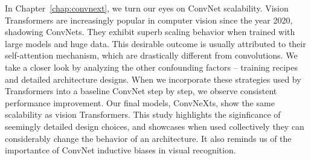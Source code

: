 \documentclass{ucbthesis}
\begin{document}
In Chapter~\ref{chap:convnext}, we turn our eyes on ConvNet scalability. Vision Transformers are increasingly popular in computer vision since the year 2020, shadowing ConvNets. They exhibit superb scaling behavior when trained with large models and huge data. This desirable outcome is usually attributed to their self-attention mechanism, which are drastically different from convolutions. We take a closer look by analyzing the other confounding factors -- training recipes and detailed architecture designs. When we incorporate these strategies used by Transformers into a baseline ConvNet step by step, we observe consistent performance improvement. Our final models, ConvNeXts, show the same scalability as vision Transformers. This study highlights the siginficance of seemingly detailed design choices, and showcases when used collectively they can considerably change the behavior of an architecture. It also reminds us of the importantce of ConvNet inductive biases in visual recognition.



% 

% 

% 
\end{document}
